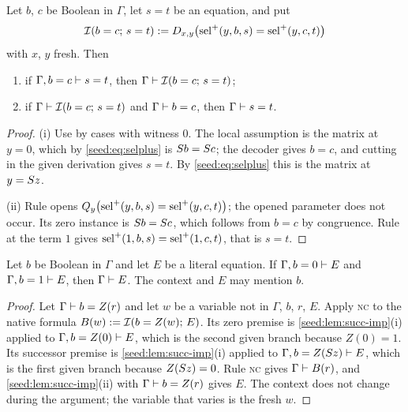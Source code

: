 \begin{lemma}\label{seed:lem:succ-imp}
Let $b$, $c$ be Boolean in $\Gamma$, let $s=t$ be an equation, and put
\[
 \mathcal I(b=c;\,s=t)\mathrel{:=}
 D_{x,y}\bigl(\operatorname{sel}^{+}(y,b,s)=\operatorname{sel}^{+}(y,c,t)\bigr)
\]
with $x$, $y$ fresh. Then
\begin{enumerate}[label=(\roman*),nosep]
\item if $\Gamma,b=c\vdash s=t$, then $\Gamma\vdash\mathcal I(b=c;\,s=t)$;
\item if $\Gamma\vdash\mathcal I(b=c;\,s=t)$ and $\Gamma\vdash b=c$, then
$\Gamma\vdash s=t$.
\end{enumerate}
\end{lemma}

\begin{proof}
(i) Use  by cases with witness $0$. The local assumption is the
matrix at $y=0$, which by \eqref{seed:eq:selplus} is $S b=S c$; the
decoder gives $b=c$, and cutting in the given derivation gives $s=t$. By
\eqref{seed:eq:selplus} this is the matrix at $y=S z$.

(ii) Rule  opens
$Q_{y}\bigl(\operatorname{sel}^{+}(y,b,s)=\operatorname{sel}^{+}(y,c,t)\bigr)$; the opened parameter does
not occur. Its zero instance is $S b=S c$, which follows from $b=c$ by
congruence. Rule  at the term $1$ gives
$\operatorname{sel}^{+}(1,b,s)=\operatorname{sel}^{+}(1,c,t)$, that is $s=t$.
\end{proof}

\begin{lemma}\label{seed:lem:succ-cases}
Let $b$ be Boolean in $\Gamma$ and let $E$ be a literal equation. If
$\Gamma,b=0\vdash E$ and $\Gamma,b=1\vdash E$, then $\Gamma\vdash E$. The
context and $E$ may mention $b$.
\end{lemma}

\begin{proof}
Let $\Gamma\vdash b=Z(r)$ and let $w$ be a variable not in $\Gamma$, $b$,
$r$, $E$. Apply \textsc{nc} to the native formula
$B(w)\mathrel{:=}\mathcal I(b=Z(w);\,E)$. Its zero premise is
\cref{seed:lem:succ-imp}(i) applied to $\Gamma,b=Z(0)\vdash E$, which is the
second given branch because $Z(0)=1$. Its successor premise is
\cref{seed:lem:succ-imp}(i) applied to $\Gamma,b=Z(S z)\vdash E$, which
is the first given branch because $Z(S z)=0$. Rule \textsc{nc} gives
$\Gamma\vdash B(r)$, and \cref{seed:lem:succ-imp}(ii) with
$\Gamma\vdash b=Z(r)$ gives $E$. The context does not change during the
argument; the variable that varies is the fresh $w$.
\end{proof}

